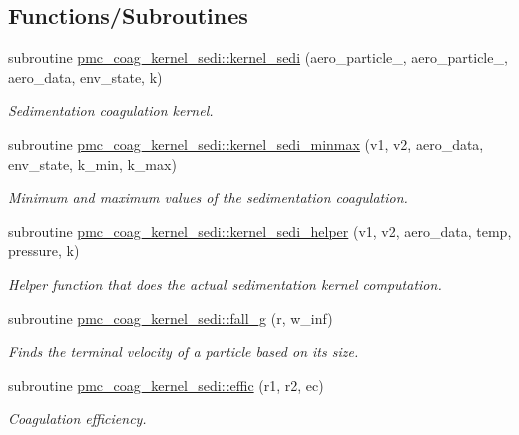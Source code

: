 \subsection*{Functions/\+Subroutines}
\begin{DoxyCompactItemize}
\item 
subroutine \mbox{\hyperlink{namespacepmc__coag__kernel__sedi_a2c2e6a3e75e04aa6d816b77d06548612}{pmc\+\_\+coag\+\_\+kernel\+\_\+sedi\+::kernel\+\_\+sedi}} (aero\+\_\+particle\+\_, aero\+\_\+particle\+\_, aero\+\_\+data, env\+\_\+state, k)
\begin{DoxyCompactList}\small\item\em Sedimentation coagulation kernel. \end{DoxyCompactList}\item 
subroutine \mbox{\hyperlink{namespacepmc__coag__kernel__sedi_aee04f9e9aa69bade2895e9dc24e78c57}{pmc\+\_\+coag\+\_\+kernel\+\_\+sedi\+::kernel\+\_\+sedi\+\_\+minmax}} (v1, v2, aero\+\_\+data, env\+\_\+state, k\+\_\+min, k\+\_\+max)
\begin{DoxyCompactList}\small\item\em Minimum and maximum values of the sedimentation coagulation. \end{DoxyCompactList}\item 
subroutine \mbox{\hyperlink{namespacepmc__coag__kernel__sedi_a6af5810c7b64984bc575402ad7d02851}{pmc\+\_\+coag\+\_\+kernel\+\_\+sedi\+::kernel\+\_\+sedi\+\_\+helper}} (v1, v2, aero\+\_\+data, temp, pressure, k)
\begin{DoxyCompactList}\small\item\em Helper function that does the actual sedimentation kernel computation. \end{DoxyCompactList}\item 
subroutine \mbox{\hyperlink{namespacepmc__coag__kernel__sedi_a4fd035b7ac68a481cfdbb49b3a434bf8}{pmc\+\_\+coag\+\_\+kernel\+\_\+sedi\+::fall\+\_\+g}} (r, w\+\_\+inf)
\begin{DoxyCompactList}\small\item\em Finds the terminal velocity of a particle based on its size. \end{DoxyCompactList}\item 
subroutine \mbox{\hyperlink{namespacepmc__coag__kernel__sedi_a41fae90a487c95876488cbbeb83d07e9}{pmc\+\_\+coag\+\_\+kernel\+\_\+sedi\+::effic}} (r1, r2, ec)
\begin{DoxyCompactList}\small\item\em Coagulation efficiency. \end{DoxyCompactList}\end{DoxyCompactItemize}


